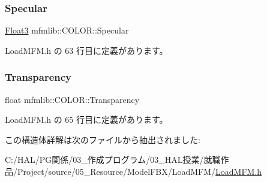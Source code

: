 \subsubsection{\texorpdfstring{Specular}{Specular}}
{\footnotesize\ttfamily \mbox{\hyperlink{structmfmlib_1_1_float3}{Float3}} mfmlib\+::\+C\+O\+L\+O\+R\+::\+Specular}



 Load\+M\+F\+M.\+h の 63 行目に定義があります。

\mbox{\label{structmfmlib_1_1_c_o_l_o_r_a5b50ad6ab93f151be8466ce16ac59e97}} 
\subsubsection{\texorpdfstring{Transparency}{Transparency}}
{\footnotesize\ttfamily float mfmlib\+::\+C\+O\+L\+O\+R\+::\+Transparency}



 Load\+M\+F\+M.\+h の 65 行目に定義があります。



この構造体詳解は次のファイルから抽出されました\+:\begin{DoxyCompactItemize}
\item 
C\+:/\+H\+A\+L/\+P\+G関係/03\+\_\+作成プログラム/03\+\_\+\+H\+A\+L授業/就職作品/\+Project/source/05\+\_\+\+Resource/\+Model\+F\+B\+X/\+Load\+M\+F\+M/\mbox{\hyperlink{_load_m_f_m_8h}{Load\+M\+F\+M.\+h}}\end{DoxyCompactItemize}
